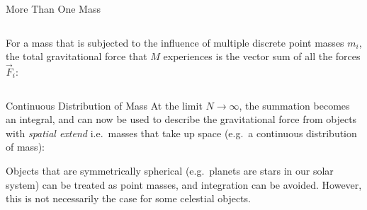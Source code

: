 \documentclass[12pt,compress,aspectratio=169]{beamer}
\begin{document}
\begin{frame}{More Than One Mass}
  \begin{columns}

    For a mass that is subjected to the influence of multiple discrete point
    masses $m_i$, the total gravitational force that $M$ experiences is the
    vector sum of all the forces $\vec F_i$:
    
  \end{columns}
\end{frame}



\begin{frame}{Continuous Distribution of Mass}
  At the limit $N\rightarrow\infty$, the summation becomes an integral, and can
  now be used to describe the gravitational force from objects with
  \emph{spatial extend} i.e.\ masses that take up space (e.g.\ a continuous
  distribution of mass):


  Objects that are symmetrically spherical (e.g.\ planets are stars in our
  solar system) can be treated as point masses, and integration can be avoided.
  However, this is not necessarily the case for some celestial objects.
\end{frame}
\end{document}
